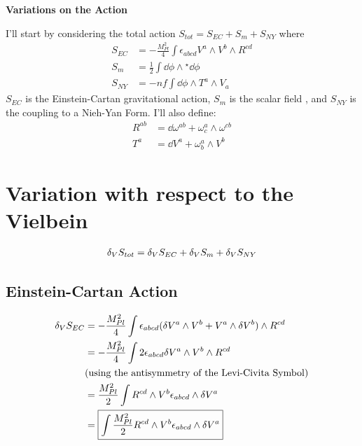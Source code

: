 \documentclass[12pt]{article}
\newcommand{\hodge}{{^\star}}
\begin{document}
\begin{center}
  \Large\textbf{Variations on the Action} \\
  \large{}
\end{center}

I'll start by considering the total action $S_{tot} = S_{EC} + S_m + S_{NY}$ where
\begin{align}
  S_{EC} &= -\frac{M_{Pl}^2}{4}\int\epsilon_{abcd}V^a \wedge V^b \wedge R^{cd} \\
  S_m &= \frac{1}{2}\int\dd\phi\wedge\hodge\dd\phi \\
  S_{NY} &= -\mathit{nf}\int\dd\phi\wedge T^a \wedge V_a
\end{align}
$S_{EC}$ is the Einstein-Cartan gravitational action, $S_m$ is the scalar field , and $S_{NY}$ is the coupling to a Nieh-Yan Form. I'll also define:
\begin{align*}
  R^{ab} &= \dd\omega^{ab} + \omega^a_c \wedge \omega^{cb} \\
  T^a &= \dd V^a + \omega^a_b \wedge V^b
\end{align*}

\section{Variation with respect to the Vielbein}
\begin{align}
  \var_V{S_{tot}} = \var_V{S_{EC}} + \var_V{S_m} + \var_V{S_{NY}}
\end{align}
\subsection{Einstein-Cartan Action}
\begin{align}
  \var_V{S_{EC}} &= -\frac{M_{Pl}^2}{4}\int \epsilon_{abcd}(\var V^a \wedge V^b + V^a \wedge \var V^b) \wedge R^{cd} \nonumber \\
  &= -\frac{M_{Pl}^2}{4}\int 2\epsilon_{abcd}\var V^a \wedge V^b \wedge R^{cd} \nonumber \\ &\text{(using the antisymmetry of the Levi-Civita Symbol)} \nonumber\\
  &= \frac{M_{Pl}^2}{2}\int R^{cd} \wedge V^b \epsilon_{abcd} \wedge \var V^a \nonumber \\
  &= \boxed{\int \frac{M_{Pl}^2}{2} R^{cd} \wedge V^b \epsilon_{abcd} \wedge \var V^a}
\end{align}
\end{document}
